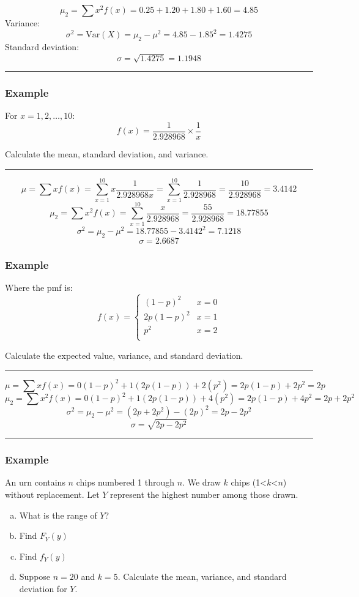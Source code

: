 \documentclass{report}
\newcommand{\ex}{\noindent\rule{\linewidth}{0.2pt}}
\begin{document}
$$\mu_2 = \sum x^2 f(x) = 0.25 + 1.20 + 1.80 + 1.60 = 4.85 $$
Variance: $$\sigma^2 = \text{Var}(X) = \mu_2 - \mu^2 = 4.85 - 1.85^2 = \boxed{1.4275}$$
Standard deviation: $$ \sigma = \sqrt{ 1.4275 } = \boxed{1.1948}$$

\ex

\subsubsection*{Example}

For $x = 1,2, \dots, 10$: $$f(x) = \frac{1}{2.928968} \times  \frac{1}{x}$$ 

Calculate the mean, standard deviation, and variance. 

\ex

$$\mu = \sum x f(x) = \sum_{x=1}^{10} x \frac{1}{2.928968x} = \sum_{x=1}^{10} \frac{1}{2.928968}  =\frac{10}{2.928968} = \boxed{3.4142}$$
$$\mu_2 = \sum x^2 f(x) = \sum_{x=1}^{10} \frac{x}{2.928968}  =\frac{55}{2.928968} = \boxed{18.77855}$$
$$\sigma^2 = \mu_2 - \mu^2 = 18.77855 - 3.4142^2 = \boxed{7.1218}$$
$$\sigma =  \boxed{2.6687}$$

\subsubsection*{Example}

Where the pmf is: $$f(x) = \begin{cases}
(1-p)^2 & x=0 \\
2p(1-p)^2 & x=1 \\
p^2 & x=2 \\
\end{cases}$$

Calculate the expected value, variance, and standard deviation. 

\ex

$$\mu = \sum xf(x) = 0(1-p)^2 + 1(2p(1-p)) + 2(p^2) = 2p(1-p) + 2p^2 = \boxed{2p}$$
$$\mu_2 = \sum x^2 f(x) = 0(1-p)^2 + 1(2p(1-p)) + 4(p^2) = 2p(1-p) + 4p^2 = 2p + 2p^2$$
$$\sigma^2 = \mu_2 - \mu^2 = (2p+2p^2) - (2p)^2 = \boxed{2p -2p^2}$$
$$\sigma =  \boxed{\sqrt{2p -2p^2}}$$

\ex 

\subsubsection*{Example}

An urn contains $n$ chips numbered 1 through $n$. We draw $k$ chips (1<$k$<$n$) without replacement. Let $Y$ represent the highest number among those drawn. \begin{enumerate}[(a)]
\item What is the range of $Y$?
\item Find $F_Y(y)$
\item Find $f_Y(y)$
\item Suppose $n=20$ and $k=5$. Calculate the mean, variance, and standard deviation for $Y$.
\end{enumerate}
\end{document}
